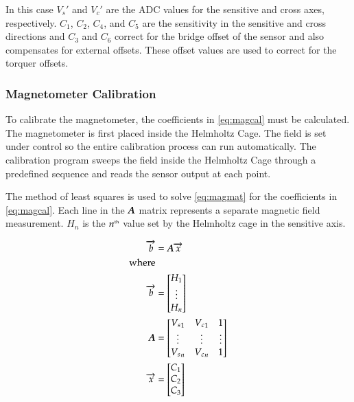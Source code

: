In this case $V_s'$ and $V_c'$ are the \ac{ADC} values for the sensitive and cross axes, respectively. $C_1$, $C_2$, $C_4$, and $C_5$ are the sensitivity in the sensitive and cross directions and $C_3$ and $C_6$ correct for the bridge offset of the sensor and also compensates for external offsets. These offset values are used to correct for the torquer offsets.

\subsubsection{Magnetometer Calibration}
\label{sec:magcal}

To calibrate the magnetometer, the coefficients in \cref{eq:magcal} must be calculated. The magnetometer is first placed inside the Helmholtz Cage. The field is set under \matlab control so the entire calibration process can run automatically. The calibration program sweeps the field inside the Helmholtz Cage through a predefined sequence and reads the sensor output at each point. 

The method of least squares is used to solve \cref{eq:magmat} for the coefficients in \cref{eq:magcal}. Each line in the $\boldsymbol{A}$ matrix represents a separate magnetic field measurement. $H_n$ is the $n^{\text{\tiny th}}$ value set by the Helmholtz cage in the sensitive axis. 

\begin{equation}
    \label{eq:magmat}
    \begin{split}
    \vect{b}&=\matt{A} \vect{x} \\
    {\text{\raggedright where}} \\
    \vect{b}&= 
    \begin{bmatrix}
        H_1 \\
        \vdots \\
        H_n \\
    \end{bmatrix} \\
    \matt{A}&=
    \begin{bmatrix}
        {V_s}_1 & {V_c}_1 & 1 \\
        \vdots & \vdots & \vdots\\
        {V_s}_n & {V_c}_n & 1 \\
    \end{bmatrix} \\
    \vect{x}&= 
    \begin{bmatrix}
        C_1 \\
        C_2 \\
        C_3 \\
    \end{bmatrix} 
    \end{split}
\end{equation}

